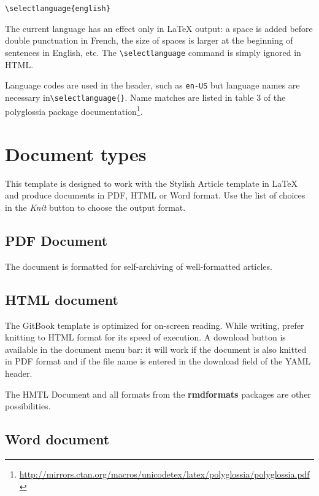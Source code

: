 \documentclass[fleqn,10pt]{latex/stylish_article} %
\begin{document}
\begin{verbatim}
\selectlanguage{english}
\end{verbatim}

The current language has an effect only in LaTeX output: a space is added before double punctuation in French, the size of spaces is larger at the beginning of sentences in English, etc.
The \texttt{\textbackslash{}selectlanguage} command is simply ignored in HTML.

Language codes are used in the header, such as \texttt{en-US} but language names are necessary in\break\texttt{\textbackslash{}selectlanguage\{\}}.
Name matches are listed in table 3 of the polyglossia package documentation\footnote{\url{http://mirrors.ctan.org/macros/unicodetex/latex/polyglossia/polyglossia.pdf}}.

\section{Document types}\label{document-types}

This template is designed to work with the Stylish Article template in LaTeX and produce documents in PDF, HTML or Word format.
Use the list of choices in the \emph{Knit} button to choose the output format.

\subsection{PDF Document}\label{pdf-document}

The document is formatted for self-archiving of well-formatted articles.

\subsection{HTML document}\label{html-document}

The GitBook template is optimized for on-screen reading.
While writing, prefer knitting to HTML format for its speed of execution.
A download button is available in the document menu bar: it will work if the document is also knitted in PDF format and if the file name is entered in the download field of the YAML header.

The HMTL Document and all formats from the \textbf{rmdformats} packages are other possibilities.

\subsection{Word document}\label{word-document}
\end{document}
